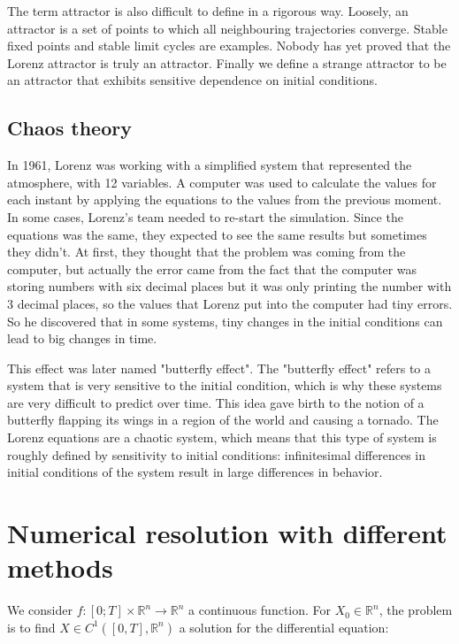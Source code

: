 \documentclass[12pt]{article}
\begin{document}
	\noindent The term attractor is also difficult to define in a rigorous way. Loosely, an attractor is a set of points to which all neighbouring trajectories converge. Stable fixed points and
	stable limit cycles are examples. Nobody has yet proved that the Lorenz attractor is truly an attractor. Finally we define a strange attractor to be an attractor that exhibits sensitive dependence on initial conditions\cite{lecture6}.
	
	\subsection{Chaos theory}
	
	In 1961, Lorenz was working with a simplified system that represented the atmosphere, with 12 variables. A computer was used to calculate the values for each instant by applying the equations to the values from the previous moment. In some cases, Lorenz’s team needed to re-start the simulation. Since the equations was the same, they expected to see the same results but sometimes they didn’t. At first, they thought that the problem was coming from the computer, but actually the error came from the fact that the computer was storing numbers with six decimal places but it was only printing the number with 3 decimal places, so the values that Lorenz put into the computer had tiny errors. So he discovered that in some systems, tiny changes in the initial conditions can lead to big changes in time.
	
	\noindent This effect was later named "butterfly effect". The "butterfly effect" refers to a system that is very sensitive to the initial condition, which is why these systems are very difficult to predict over time. This idea gave birth to the notion of a butterfly flapping its wings in a region of the world and causing a tornado.
	The Lorenz equations are a chaotic system, which means that this type of system is roughly defined by sensitivity to initial conditions: infinitesimal differences in initial conditions of the system result in large differences in behavior.
	
	\section{Numerical resolution with different methods}
	
	We consider $f : [0; T] \times \mathbb{R}^n \rightarrow \mathbb{R}^n$ a continuous function. For $X_0\in \mathbb{R}^n$, the problem is to find  $X\in C^1([0,T],\mathbb{R}^n)$ a solution for the differential equation:
	
\end{document}
